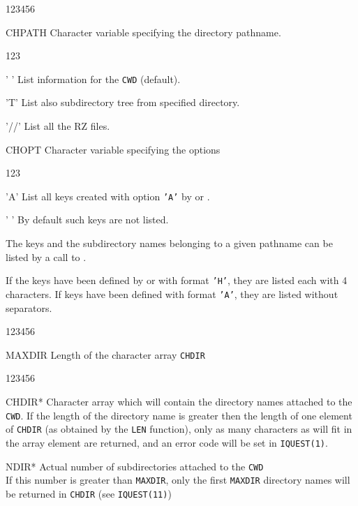 
\begin{DLtt}{123456}
\item[CHPATH]Character variable specifying the directory pathname.
\begin{DLtt}{123}
\item[' ']List information for the {\tt CWD} (default).
\item['T']List also subdirectory tree from specified directory.
\item['//']List all the RZ files.
\end{DLtt}
\item[CHOPT]Character variable specifying the options
\begin{DLtt}{123}
\item['A']List all keys created with option {\tt'A'} by 
or .
\item[' ']By default such keys are not listed.
\end{DLtt}
\end{DLtt}

The keys and the subdirectory names belonging to a given pathname can
be listed by a call to .

If the keys have been defined by  or 
with format {\tt'H'},
they are listed each with 4 characters. If keys have been defined
with format {\tt'A'}, they are listed without separators.


\Idesc
\begin{DLtt}{123456}
\item[MAXDIR]Length of the character array {\tt CHDIR}
\end{DLtt}
\Odesc
\begin{DLtt}{123456}
\item[CHDIR*]Character array which will contain the directory names attached to
the {\tt CWD}. If the length of the directory name is greater then the length
of one element of {\tt CHDIR} (as obtained by the {\tt LEN} function), only
as many characters as will fit in the array element are returned, and
an error code will be set in {\tt IQUEST(1)}.
\item[NDIR*]Actual number of subdirectories attached to the {\tt CWD}\\
If this number is greater than {\tt MAXDIR}, only the first
{\tt MAXDIR} directory names will be returned in {\tt CHDIR}
(see {\tt IQUEST(11)})
\end{DLtt}

